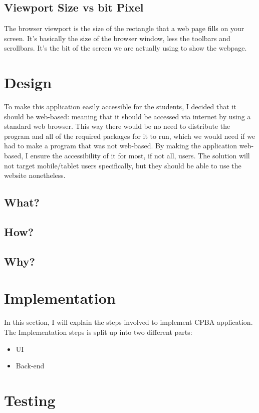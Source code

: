 \documentclass[11pt]{article}
\begin{document}
\subsection{Viewport Size vs bit Pixel}%
The browser viewport is the size of the rectangle that a web page fills on your screen. It’s basically the size of the browser window, less the toolbars and scrollbars. It’s the bit of the screen we are actually using to show the webpage.\\
\section{Design}
To make this application easily accessible for the students, I decided that it should be web-based: meaning that it should be accessed via internet by using a standard web browser. This way there would be no need to distribute the program and all of the required packages for it to run, which we would need if we had to make a program that was not web-based. By making the application web-based, I ensure the accessibility of it for most, if not all, users. The solution will not target mobile/tablet users specifically, but they should be able to use the website nonetheless.
\subsection{What?}
\subsection{How?}
\subsection{Why?}
\section{Implementation}
In this section, I will explain the steps involved to implement CPBA application. The Implementation steps is split up into two different parts:
\begin{itemize}
\item UI
\item Back-end
\end{itemize}
\section{Testing}
\end{document}
